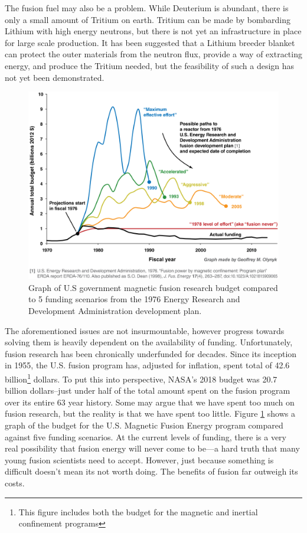 The fusion fuel may also be a problem. While Deuterium is abundant, there is only a small amount of Tritium on earth. Tritium can be made by bombarding Lithium with high energy neutrons, but there is not yet an infrastructure in place for large scale production. It has been suggested that a Lithium breeder blanket can protect the outer materials from the neutron flux, provide a way of extracting energy, and produce the Tritium needed, but the feasibility of such a design has not yet been demonstrated.

\begin{figure}
    \centering
    \includegraphics[width=12cm]{figures/fusion_never.png}
    \caption{Graph of U.S government magnetic fusion research budget compared to 5 funding scenarios from the 1976 Energy Research and Development Administration development plan.\cite{1976_fusion}}
    \label{fig:fusion_never}
\end{figure}
The aforementioned issues are not insurmountable, however progress towards solving them is heavily dependent on the availability of funding. Unfortunately, fusion research has been chronically underfunded for decades. Since its inception in 1955, the U.S. fusion program has, adjusted for inflation, spent total of 42.6 billion\footnote{This figure includes both the budget for the magnetic and inertial confinement programs} dollars. To put this into perspective, NASA's 2018 budget was 20.7 billion dollars--just under half of the total amount spent on the fusion program over its entire 63 year history. Some may argue that we have spent too much on fusion research, but the reality is that we have spent too little. Figure \ref{fig:fusion_never} shows a graph of the budget for the U.S. Magnetic Fusion Energy program compared against five funding scenarios\cite{1976_fusion}. At the current levels of funding, there is a very real possibility that fusion energy will never come to be---a hard truth that many young fusion scientists need to accept.
However, just because something is difficult doesn't mean its not worth doing. The benefits of fusion far outweigh its costs.


